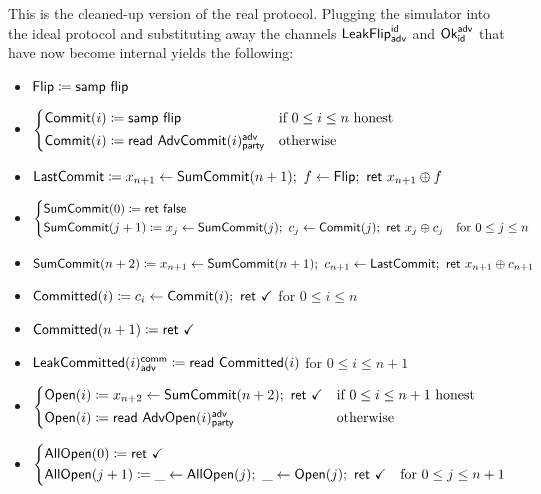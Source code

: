 \noindent This is the cleaned-up version of the real protocol. Plugging the simulator into the ideal protocol and substituting away the channels $\mathsf{LeakFlip}^{\mathsf{id}}_{\mathsf{adv}}$ and $\mathsf{Ok}^{\mathsf{adv}}_{\mathsf{id}}$ that have now become internal yields the following:

\begin{itemize}
\item $\mathsf{Flip} \coloneqq \mathsf{samp} \ \mathsf{flip}$
\item {\color{blue} $\begin{cases*} \Commit(i) \coloneqq \samp{\flip} & \text{if $0 \leq i \leq n$ honest} \\ \Commit(i) \coloneqq \read{\AdvCommit(i)^\adv_\party} & \text{otherwise} \end{cases*}$}
\item {\color{blue} $\mathsf{LastCommit} \coloneqq x_{n+1} \leftarrow \mathsf{SumCommit}(n+1); \ f \leftarrow \mathsf{Flip}; \ \mathsf{ret} \ x_{n+1} \oplus f$}
\item {\color{blue} $\begin{cases*} \SumCommit(0) \coloneqq \ret{\false} & \\ \SumCommit(j+1) \coloneqq x_j \leftarrow \SumCommit(j); \ c_j \leftarrow \Commit(j); \ \ret{x_j \oplus c_j} & \text{for $0 \leq j \leq n$} \end{cases*}$}
\item {\color{blue} $\SumCommit(n+2) \coloneqq x_{n+1} \leftarrow \SumCommit(n+1); \ c_{n+1} \leftarrow \LastCommit; \ \ret{x_{n+1} \oplus c_{n+1}}$}
\item {\color{magenta} $\mathsf{Committed}(i) \coloneqq c_i \leftarrow \mathsf{Commit}(i); \ \mathsf{ret} \ \checkmark$ for $0 \leq i \leq n$}
\item {\color{magenta} $\mathsf{Committed}(n+1) \coloneqq \mathsf{ret} \ \checkmark$}
\item {\color{magenta} $\mathsf{LeakCommitted}(i)^{\mathsf{comm}}_{\mathsf{adv}} \coloneqq \mathsf{read} \ \mathsf{Committed}(i)$ for $0 \leq i \leq n+1$}
\item {\color{teal} $\begin{cases*} \Open(i) \coloneqq x_{n+2} \leftarrow \SumCommit(n+2); \ \ret{\checkmark} & \text{if $0 \leq i \leq n+1$ honest} \\ \Open(i) \coloneqq \read{\AdvOpen(i)^\adv_\party} & \text{otherwise} \end{cases*}$}
\item {\color{teal} $\begin{cases*} \AllOpen(0) \coloneqq \ret{\checkmark} & \\ \AllOpen(j+1) \coloneqq \_ \leftarrow \AllOpen(j); \ \_ \leftarrow \Open(j); \ \ret{\checkmark} & \text{for $0 \leq j \leq n+1$} \end{cases*}$}

\end{itemize}
